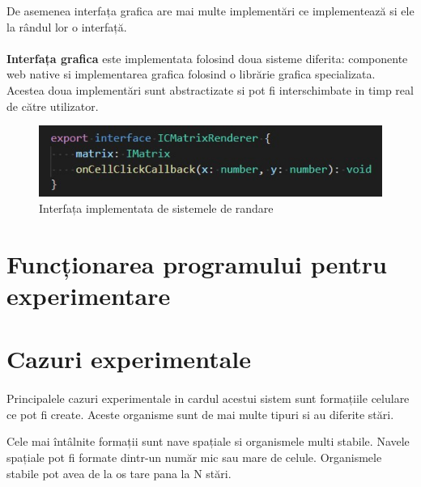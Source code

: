 \documentclass[11pt ,A4]{article}
\begin{document}
                De asemenea interfața grafica are mai multe implementări ce implementează si ele la rândul lor o interfață.



            \paragraph{}
                \textbf{Interfața grafica} este implementata folosind doua sisteme diferita: componente web native si implementarea grafica folosind o librărie grafica specializata.
                Acestea doua implementări sunt abstractizate si pot fi interschimbate  in timp real de către utilizator.
                \begin{figure}[H]
                    \centering
                    \includegraphics[scale=0.8]{ICMatricRenderer_interface}
                    \caption{Interfața implementata de sistemele de randare}
                \end{figure}

    \section{Funcționarea programului pentru experimentare}

        

    \section{Cazuri experimentale}
        \paragraph{}
            Principalele cazuri experimentale in cardul acestui sistem sunt formațiile celulare ce pot fi create.
            Aceste organisme sunt de mai multe tipuri si au diferite stări.

            Cele mai întâlnite formații sunt nave spațiale si organismele multi stabile.
            Navele spațiale pot fi formate dintr-un număr mic sau mare de celule.
            Organismele stabile pot avea de la os tare pana la N stări.
\end{document}
